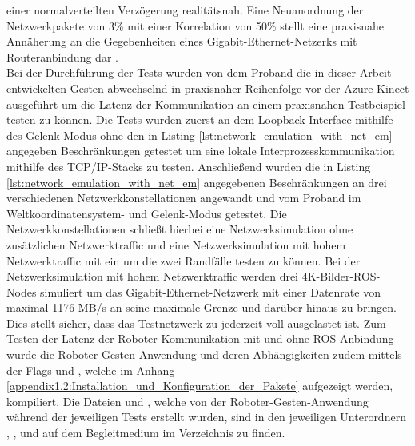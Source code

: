 einer normalverteilten Verzögerung realitätsnah. Eine Neuanordnung der Netzwerkpakete von 3\% mit einer Korrelation von 50\% stellt eine praxisnahe Annäherung an die Gegebenheiten eines Gigabit-Ethernet-Netzerks mit Routeranbindung dar \cite{admin_understanding_2018}.\\

Bei der Durchführung der Tests wurden von dem Proband die in dieser Arbeit entwickelten Gesten abwechselnd in praxisnaher Reihenfolge vor der Azure Kinect ausgeführt um die Latenz der Kommunikation an einem praxisnahen Testbeispiel testen zu können. Die Tests wurden zuerst an dem Loopback-Interface mithilfe des Gelenk-Modus ohne den in Listing \ref{lst:network_emulation_with_net_em} angegeben Beschränkungen getestet um eine lokale Interprozesskommunikation mithilfe des TCP/IP-Stacks zu testen. Anschließend wurden die in Listing \ref{lst:network_emulation_with_net_em} angegebenen Beschränkungen an drei verschiedenen Netzwerkkonstellationen angewandt und vom Proband im Weltkoordinatensystem- und Gelenk-Modus getestet. Die Netzwerkkonstellationen schließt hierbei eine Netzwerksimulation ohne zusätzlichen Netzwerktraffic und eine Netzwerksimulation mit hohem Netzwerktraffic mit ein um die zwei Randfälle testen zu können. Bei der Netzwerksimulation mit hohem Netzwerktraffic werden drei 4K-Bilder-ROS-Nodes simuliert um das Gigabit-Ethernet-Netzwerk mit einer Datenrate von maximal 1176 MB/s an seine maximale Grenze und darüber hinaus zu bringen. Dies stellt sicher, dass das Testnetzwerk zu jederzeit voll ausgelastet ist. Zum Testen der Latenz der Roboter-Kommunikation mit und ohne ROS-Anbindung wurde die Roboter-Gesten-Anwendung und deren Abhängigkeiten zudem mittels der Flags  und , welche im Anhang \ref{appendix1.2:Installation_und_Konfiguration_der_Pakete} aufgezeigt werden, kompiliert. Die Dateien  und , welche von der Roboter-Gesten-Anwendung während der jeweiligen Tests erstellt wurden, sind in den jeweiligen Unterordnern , ,  und  auf dem Begleitmedium im Verzeichnis  zu finden.

